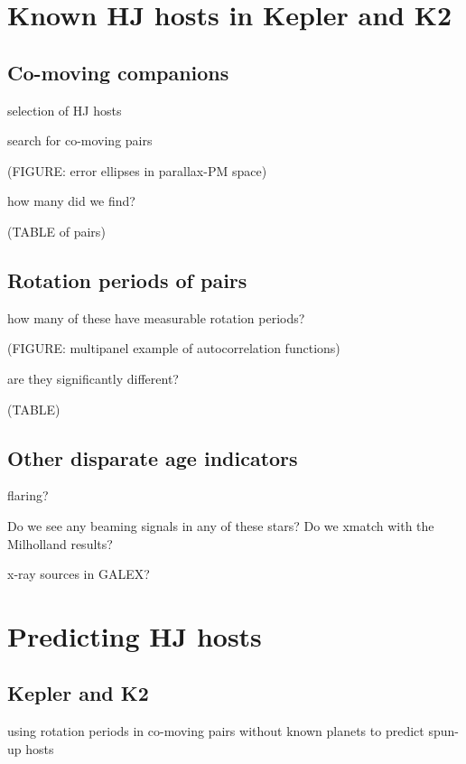 \documentclass[twocolumn]{aastex62}
\begin{document}



\section{Known HJ hosts in Kepler and K2}
\subsection{Co-moving companions}

selection of HJ hosts

search for co-moving pairs

(FIGURE: error ellipses in parallax-PM space)

how many did we find?

(TABLE of pairs)






\subsection{Rotation periods of pairs}

how many of these have measurable rotation periods?

(FIGURE: multipanel example of autocorrelation functions)

are they significantly different?

(TABLE)

\subsection{Other disparate age indicators}

flaring?

Do we see any beaming signals in any of these stars? Do we xmatch with the Milholland results?

x-ray sources in GALEX?



\section{Predicting HJ hosts}
\subsection{Kepler and K2}
using rotation periods in co-moving pairs without known planets to predict spun-up hosts
\end{document}
